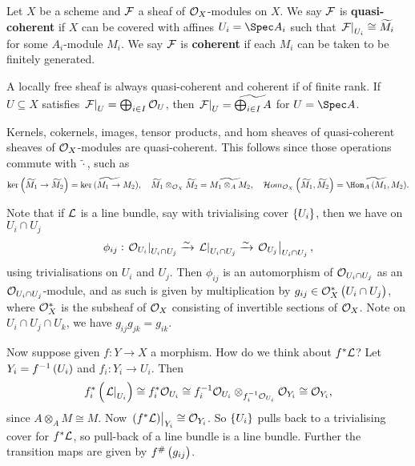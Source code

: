 \begin{definition*}
Let $ X $ be a scheme and $ \mathcal{F} $ a sheaf of $ \mathcal{O}_X $-modules on $ X $. We say $ \mathcal{F} $ is \textbf{quasi-coherent} if $ X $ can be covered with affines $ U_i = \Spec A_i $ such that $ \left. \mathcal{F} \right|_{U_i} \cong \widetilde{M_i} $ for some $ A_i $-module $ M_i $. We say $ \mathcal{F} $ is \textbf{coherent} if each $ M_i $ can be taken to be finitely generated.
\end{definition*}

\begin{example*}
A locally free sheaf is always quasi-coherent and coherent if of finite rank. If $ U \subseteq X $ satisfies $ \left. \mathcal{F} \right|_U = \bigoplus_{i \in I} \mathcal{O}_U $, then $ \left. \mathcal{F} \right|_U = \widetilde{\bigoplus_{i \in I} A} $ for $ U = \Spec A $.
\end{example*}

Kernels, cokernels, images, tensor products, and hom sheaves of quasi-coherent sheaves of $ \mathcal{O}_X $-modules are quasi-coherent. This follows since those operations commute with $ \widetilde{\cdot} $, such as
$$ \ker \br{\widetilde{M_1} \to \widetilde{M_2}} = \widetilde{\ker \br{M_1 \to M_2}}, \quad \widetilde{M_1} \otimes_{\OOO_X} \widetilde{M_2} = \widetilde{M_1 \otimes_A M_2}, \quad \HOM_{\OOO_X}\br{\widetilde{M_1}, \widetilde{M_2}} = \widetilde{\Hom_A\br{M_1, M_2}}. $$

\pagebreak

\begin{remark*}
Note that if $ \mathcal{L} $ is a line bundle, say with trivialising cover $ \cbr{U_i} $, then we have on $ U_i \cap U_j $
$$ \phi_{ij} : \left. \mathcal{O}_{U_i} \right|_{U_i \cap U_j} \xrightarrow{\sim} \left. \mathcal{L} \right|_{U_i \cap U_j} \xrightarrow{\sim} \left. \mathcal{O}_{U_j} \right|_{U_i \cap U_j}, $$
using trivialisations on $ U_i $ and $ U_j $. Then $ \phi_{ij} $ is an automorphism of $ \mathcal{O}_{U_i \cap U_j} $ as an $ \mathcal{O}_{U_i \cap U_j} $-module, and as such is given by multiplication by $ g_{ij} \in \OOO_X^*\br{U_i \cap U_j} $, where $ \mathcal{O}_X^* $ is the subsheaf of $ \mathcal{O}_X $ consisting of invertible sections of $ \mathcal{O}_X $. Note on $ U_i \cap U_j \cap U_k $, we have $ g_{ij}g_{jk} = g_{ik} $.
\end{remark*}

Now suppose given $ f : Y \to X $ a morphism. How do we think about $ f^*\mathcal{L} $? Let $ Y_i = f^{-1}\br{U_i} $ and $ f_i : Y_i \to U_i $. Then
$$ f_i^*\br{\eval{\LLL}_{U_i}} \cong f_i^*\OOO_{U_i} \cong f_i^{-1}\OOO_{U_i} \otimes_{f_i^{-1}\OOO_{U_i}} \OOO_{Y_i} \cong \OOO_{Y_i}, $$
since $ A \otimes_A M \cong M $. Now $ \eval{\br{f^*\LLL}}_{Y_i} \cong \OOO_{Y_i} $. So $ \cbr{U_i} $ pulls back to a trivialising cover for $ f^*\mathcal{L} $, so pull-back of a line bundle is a line bundle. Further the transition maps are given by $ f^\#\br{g_{ij}} $.

